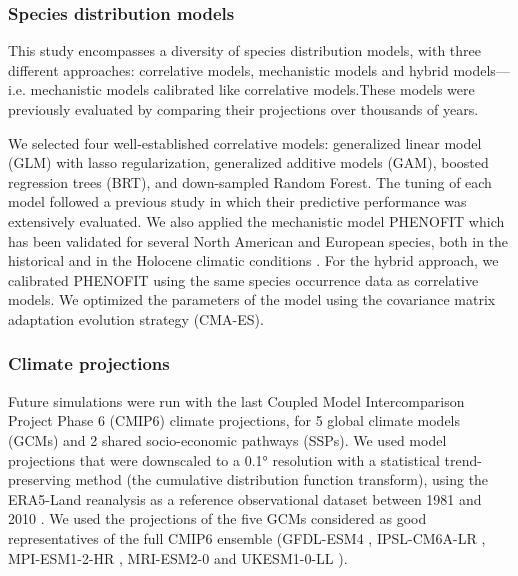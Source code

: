 \documentclass[11pt,letter]{article}
\begin{document}
\subsubsection*{Species distribution models}

This study encompasses a diversity of species distribution models, with three different approaches: correlative models, mechanistic models and hybrid models---i.e. mechanistic models calibrated like correlative models\citep{VanderMeersch2023}.These models were previously evaluated by comparing their projections over thousands of years\citep{VanderMeersch2025}.

We selected four well-established correlative models\citep{Valavi2022}: generalized linear model (GLM) with lasso regularization, generalized additive models (GAM), boosted regression trees (BRT), and down-sampled Random Forest. The tuning of each model followed a previous study in which their predictive performance was extensively evaluated\citep{Valavi2022}. We also applied the mechanistic model PHENOFIT which has been validated for several North American and European species, both in the historical and in the Holocene climatic conditions \citep{Morin2007, Saltre2013, Duputie2015, Gauzere2020, VanderMeersch2025}. For the hybrid approach, we calibrated PHENOFIT using the same species occurrence data as correlative models\citep{VanderMeersch2023}. We optimized the parameters of the model using the covariance matrix adaptation evolution strategy\citep{Hansen2001} (CMA-ES).

\subsubsection*{Climate projections}

Future simulations were run with the last Coupled Model Intercomparison Project Phase 6 (CMIP6) climate  projections, for 5 global climate models (GCMs) and 2 shared socio-economic pathways (SSPs). 
We used model projections that were downscaled to a 0.1° resolution with a statistical trend-preserving method (the cumulative distribution function transform), using the ERA5-Land reanalysis as a reference observational dataset between 1981 and 2010 \citep{Noel2022}. We used the projections of the five GCMs considered as good representatives of the full CMIP6 ensemble\citep{Noel2022} (GFDL-ESM4 \citep{Dunne2020}, IPSL-CM6A-LR \citep{Lurton2020}, MPI-ESM1-2-HR \citep{Mueller2018}, MRI-ESM2-0 \citep{Yukimoto2019} and UKESM1-0-LL \citep{Sellar2020}).
\end{document}

